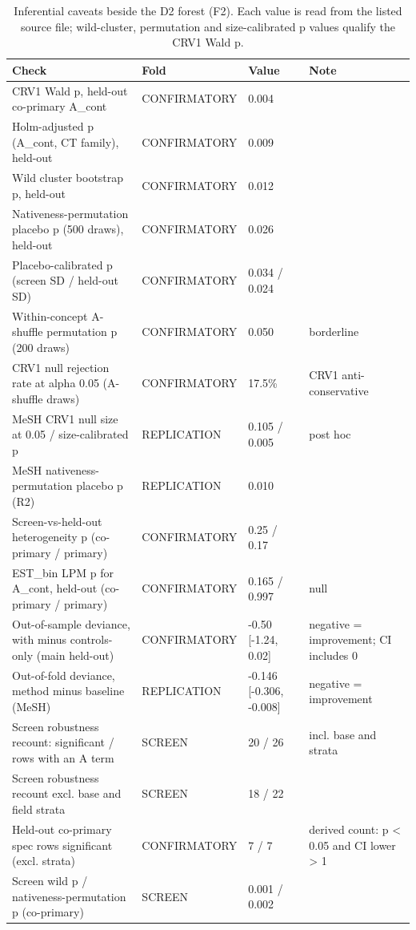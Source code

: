 \begin{table}[t]
\centering\footnotesize
\caption{Inferential caveats beside the D2 forest (F2). Each value is read from the listed source file; wild-cluster, permutation and size-calibrated p values qualify the CRV1 Wald p.}
\label{tab:inferential-caveats}
\begin{tabular}{p{6.2cm}lll}
\hline
Check & Fold & Value & Note \\
\hline
CRV1 Wald p, held-out co-primary A\_cont & CONFIRMATORY & 0.004 &  \\
Holm-adjusted p (A\_cont, CT family), held-out & CONFIRMATORY & 0.009 &  \\
Wild cluster bootstrap p, held-out & CONFIRMATORY & 0.012 &  \\
Nativeness-permutation placebo p (500 draws), held-out & CONFIRMATORY & 0.026 &  \\
Placebo-calibrated p (screen SD / held-out SD) & CONFIRMATORY & 0.034 / 0.024 &  \\
Within-concept A-shuffle permutation p (200 draws) & CONFIRMATORY & 0.050 & borderline \\
CRV1 null rejection rate at alpha 0.05 (A-shuffle draws) & CONFIRMATORY & 17.5\% & CRV1 anti-conservative \\
MeSH CRV1 null size at 0.05 / size-calibrated p & REPLICATION & 0.105 / 0.005 & post hoc \\
MeSH nativeness-permutation placebo p (R2) & REPLICATION & 0.010 &  \\
Screen-vs-held-out heterogeneity p (co-primary / primary) & CONFIRMATORY & 0.25 / 0.17 &  \\
EST\_bin LPM p for A\_cont, held-out (co-primary / primary) & CONFIRMATORY & 0.165 / 0.997 & null \\
Out-of-sample deviance, with minus controls-only (main held-out) & CONFIRMATORY & -0.50 [-1.24, 0.02] & negative = improvement; CI includes 0 \\
Out-of-fold deviance, method minus baseline (MeSH) & REPLICATION & -0.146 [-0.306, -0.008] & negative = improvement \\
Screen robustness recount: significant / rows with an A term & SCREEN & 20 / 26 & incl. base and strata \\
Screen robustness recount excl. base and field strata & SCREEN & 18 / 22 &  \\
Held-out co-primary spec rows significant (excl. strata) & CONFIRMATORY & 7 / 7 & derived count: p < 0.05 and CI lower > 1 \\
Screen wild p / nativeness-permutation p (co-primary) & SCREEN & 0.001 / 0.002 &  \\
\hline
\end{tabular}
\end{table}
